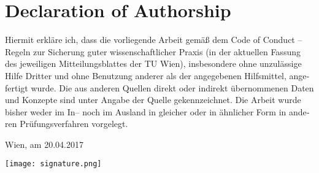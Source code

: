 \chapter*{Declaration of Authorship}
\begin{otherlanguage}{german}
Hiermit erkläre ich, dass die vorliegende Arbeit gemäß dem Code of Conduct – Regeln zur Sicherung guter wissenschaftlicher Praxis (in der aktuellen Fassung des jeweiligen Mitteilungsblattes der TU Wien), insbesondere ohne unzulässige Hilfe Dritter und ohne Benutzung anderer als der angegebenen Hilfsmittel, angefertigt wurde. Die aus anderen Quellen direkt oder indirekt übernommenen Daten und Konzepte sind unter Angabe der Quelle gekennzeichnet. Die Arbeit wurde bisher weder im In– noch im Ausland in gleicher oder in ähnlicher Form in anderen Prüfungsverfahren vorgelegt.

\vspace{1cm}

\noindent Wien, am 20.04.2017

\noindent\texttt{[image: signature.png]}
\end{otherlanguage}
\restoregeometry